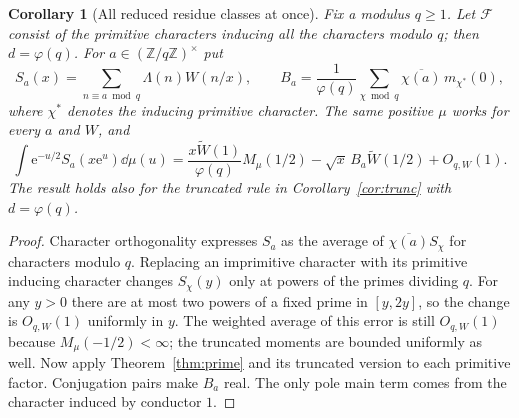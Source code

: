 \documentclass[11pt]{article}
\newtheorem{corollary}[theorem]{Corollary}
\theoremstyle{remark}\newtheorem{remark}[theorem]{Remark}
\newcommand{\ee}{\mathrm e}\newcommand{\abs}[1]{\lvert#1\rvert}
\newcommand{\spec}{\mathcal F}
\begin{document}
\begin{corollary}[All reduced residue classes at once]\label{cor:residues}
Fix a modulus $q\ge1$. Let $\spec$ consist of the primitive characters inducing all the characters modulo $q$; then $d=\varphi(q)$. For $a\in(\mathbb Z/q\mathbb Z)^\times$ put
\[
 S_a(x)=\sum_{n\equiv a\bmod q}\Lambda(n)W(n/x),\qquad
 B_a=\frac1{\varphi(q)}\sum_{\chi\bmod q}\overline{\chi(a)}\,m_{\chi^*}(0),
\]
where $\chi^*$ denotes the inducing primitive character. The same positive $\mu$ works for every $a$ and $W$, and
\[
 \int\ee^{-u/2}S_a(x\ee^u)\dd\mu(u)
 =\frac{x\widetilde W(1)}{\varphi(q)}M_\mu(1/2)
 -\sqrt x\,B_a\widetilde W(1/2)+O_{q,W}(1).
\]
The result holds also for the truncated rule in Corollary~\ref{cor:trunc} with $d=\varphi(q)$.
\end{corollary}
\begin{proof}
Character orthogonality expresses $S_a$ as the average of $\overline{\chi(a)}S_\chi$ for characters modulo $q$. Replacing an imprimitive character with its primitive inducing character changes $S_\chi(y)$ only at powers of the primes dividing $q$. For any $y>0$ there are at most two powers of a fixed prime in $[y,2y]$, so the change is $O_{q,W}(1)$ uniformly in $y$. The weighted average of this error is still $O_{q,W}(1)$ because $M_\mu(-1/2)<\infty$; the truncated moments are bounded uniformly as well. Now apply Theorem~\ref{thm:prime} and its truncated version to each primitive factor. Conjugation pairs make $B_a$ real. The only pole main term comes from the character induced by conductor $1$.
\end{proof}
\end{document}
